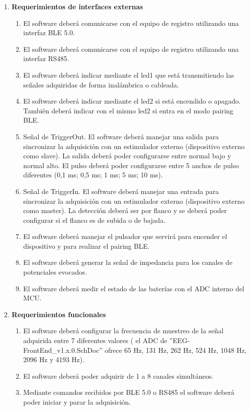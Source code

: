 \documentclass[
11pt, %
codirector, %
]{charter}
\begin{document}
\begin{enumerate}
	\item \textbf{Requerimientos de interfaces externas}
		\begin{enumerate}
			\item El software deberá comunicarse con el equipo de registro utilizando una interfaz BLE 5.0.
			\item El software deberá comunicarse con el equipo de registro utilizando una interfaz RS485. 
			\item El software deberá indicar mediante el led1 que está transmitiendo las señales adquiridas de forma inalámbrica o cableada. 
			\item El software deberá indicar mediante el led2 si está encendido o apagado. También deberá indicar con el mismo led2 si entra en el modo pairing BLE.
			\item Señal de TriggerOut. El software deberá manejar una salida para sincronizar la adquisición con un estimulador externo (dispositivo externo como slave). La salida deberá poder configurarse entre normal bajo y normal alto. El pulso deberá poder configurarse entre 5 anchos de pulso diferentes (0,1 ms; 0,5 ms; 1 ms; 5 ms; 10 ms). 
			\item Señal de TriggerIn. El software deberá manejar una entrada para sincronizar la adquisición con un estimulador externo (dispositivo externo como master). La detección deberá ser por flanco y se deberá poder configurar si el flanco es de subida o de bajada.
			\item El software deberá manejar el pulsador que servirá para encender el dispositivo y para realizar el pairing BLE.
			\item El software deberá generar la señal de impedancia para los canales de potenciales evocados.
			\item El software deberá medir el estado de las baterías con el ADC interno del MCU.
		\end{enumerate}
	\item \textbf{Requerimientos funcionales}
		\begin{enumerate}
			\item El software deberá configurar la frecuencia de muestreo de la señal adquirida entre 7 diferentes valores ( el ADC de ''EEG-FrontEnd\_v1.x.0.SchDoc” ofrece 65 Hz, 131 Hz, 262 Hz, 524 Hz, 1048 Hz, 2096 Hz y 4193 Hz).
			\item El software deberá poder adquirir de 1 a 8 canales simultáneos.
			\item Mediante comandos recibidos por BLE 5.0 o RS485 el software deberá poder iniciar y parar la adquisición.

\end{enumerate}
\end{enumerate}
\end{document}
